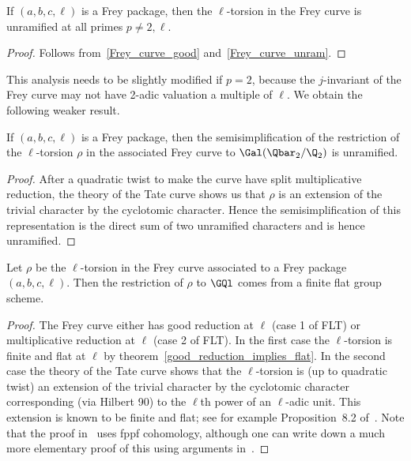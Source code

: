 \begin{corollary}\label{frey_curve_unramified}\notready If $(a,b,c,\ell)$ is a Frey package, then the $\ell$-torsion in the Frey curve is unramified at all primes $p\not=2,\ell$.
\end{corollary}
\begin{proof} Follows from~\ref{Frey_curve_good} and~\ref{Frey_curve_unram}.
\end{proof}

This analysis needs to be slightly modified if $p=2$, because the $j$-invariant of
the Frey curve may not have 2-adic valuation a multiple of $\ell$. We obtain the
following weaker result.

\begin{corollary}\label{frey_curve_at_2}\notready If $(a,b,c,\ell)$ is a Frey package, then the
  semisimplification of the restriction of the $\ell$-torsion $\rho$ in the associated Frey curve
  to $\Gal(\Qbar_2/\Q_2)$ is unramified.
\end{corollary}
\begin{proof} After a quadratic twist to make the curve have split multiplicative
  reduction, the theory of the Tate curve shows us that $\rho$ is an extension
  of the trivial character by the cyclotomic character. Hence the semisimplification of this representation is the direct sum of two
  unramified characters and is hence unramified.
\end{proof}

\begin{theorem}\label{Frey_curve_mod_ell_rep_at_ell}\notready Let $\rho$ be the $\ell$-torsion in the
  Frey curve associated to a Frey package $(a,b,c,\ell)$. Then the restriction of $\rho$ to $\GQl$ comes from a finite flat group scheme.
\end{theorem}
\begin{proof} The Frey curve either has good reduction at $\ell$ (case 1 of FLT) or multiplicative
  reduction at $\ell$ (case 2 of FLT). In the first case the $\ell$-torsion is finite and flat
  at $\ell$ by theorem~\ref{good_reduction_implies_flat}. In the second case the theory of the Tate
   curve shows that the $\ell$-torsion is (up to quadratic twist) an extension of
    the trivial character by the cyclotomic character corresponding (via Hilbert 90)
    to the $\ell$th power of an $\ell$-adic unit. This extension is known to be finite and flat;
  see for example Proposition~8.2 of~\cite{edix}. Note that the proof in~\cite{edix} uses
  fppf cohomology, although one can write down a much more elementary proof of this using
  arguments in~\cite{katz-mazur}.
\end{proof}

